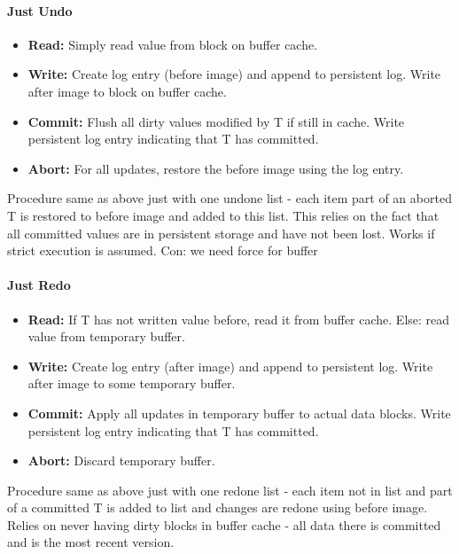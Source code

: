 \paragraph{Just Undo}
\begin{itemize}
    \item \textbf{Read:} Simply read value from block on buffer cache.
    \item \textbf{Write:} Create log entry (before image) and append to persistent log. Write after image to block on buffer cache.
    \item \textbf{Commit:} Flush all dirty values modified by T if still in cache. Write persistent log entry indicating that T has committed.
    \item \textbf{Abort:} For all updates, restore the before image using the log entry.
\end{itemize}
Procedure same as above just with one undone list - each item part of an aborted T is restored to before image and added to this list. This relies on the fact that all committed values are in persistent storage and have not been lost. Works if strict execution is assumed. Con: we need force for buffer

\paragraph{Just Redo}
\begin{itemize}
    \item \textbf{Read:} If T has not written value before, read it from buffer cache. Else: read value from temporary buffer.
    \item \textbf{Write:} Create log entry (after image) and append to persistent log. Write after image to some temporary buffer.
    \item \textbf{Commit:} Apply all updates in temporary buffer to actual data blocks. Write persistent log entry indicating that T has committed.
    \item \textbf{Abort:} Discard temporary buffer.
\end{itemize}
Procedure same as above just with one redone list - each item not in list and part of a committed T is added to list and changes are redone using before image. Relies on never having dirty blocks in buffer cache - all data there is committed and is the most recent version.

